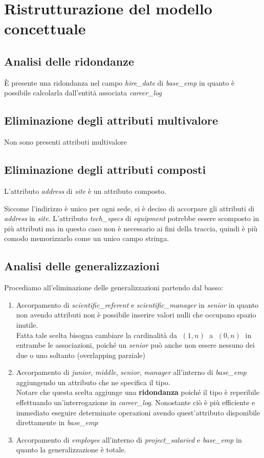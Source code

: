 \section{Ristrutturazione del modello concettuale}
\subsection{Analisi delle ridondanze}
È presente una ridondanza nel campo \textit{hire\_date} di \textit{base\_emp} in quanto è possibile calcolarla dall'entità associata \textit{career\_log}
\subsection{Eliminazione degli attributi multivalore}
Non sono presenti attributi multivalore
\subsection{Eliminazione degli attributi composti}
L'attributo \textit{address} di \textit{site} è un attributo composto.

Siccome l'indirizzo è unico per ogni sede, si è deciso di accorpare gli attributi di \textit{address} in \textit{site}.\meskip
L'attributo \textit{tech\_specs} di \textit{equipment} potrebbe essere scomposto in più attributi ma in questo caso non è necessario ai fini della traccia, quindi è più comodo memorizzarlo come un unico campo stringa.

\subsection{Analisi delle generalizzazioni}
Procediamo all'eliminazione delle generalizzazioni partendo dal basso:
\begin{enumerate}
	\item Accorpamento di \textit{scientific\_referent} e \textit{scientific\_manager} in \textit{senior} in quanto non avendo attributi non è possibile inserire valori nulli che occupano spazio inutile.\\
	      Fatta tale scelta bisogna cambiare la cardinalità da $\;(1, n)\;$ a $\;(0, n)\;$ in entrambe le associazioni, poiché un \textit{senior} può anche non essere nessuno dei due o uno soltanto (overlapping parziale)
	\item Accorpamento di \textit{junior}, \textit{middle}, \textit{senior}, \textit{manager} all'interno di \textit{base\_emp} aggiungendo un attributo che ne specifica il tipo.\\
	      Notare che questa scelta aggiunge una \textbf{ridondanza} poiché il tipo è reperibile effettuando un'interrogazione in \textit{career\_log}. Nonostante ciò è più efficiente e immediato eseguire determinate operazioni avendo quest'attributo disponibile direttamente in \textit{base\_emp}
	\item Accorpamento di \textit{employee} all'interno di \textit{project\_salaried} e \textit{base\_emp} in quanto la generalizzazione è totale.
\end{enumerate}
